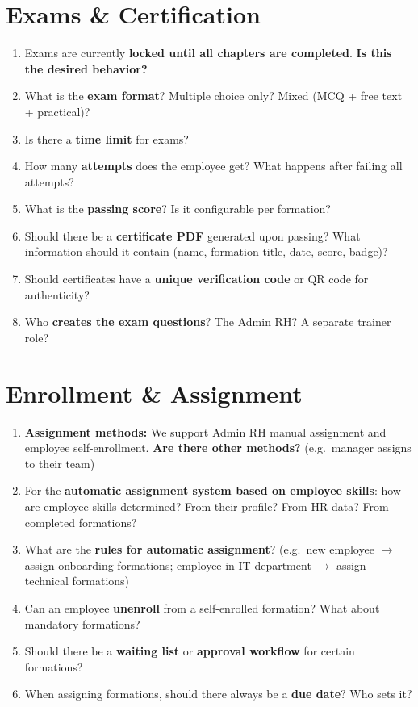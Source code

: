 \documentclass[11pt,a4paper]{article}
\begin{document}
\section{Exams \& Certification}

\begin{enumerate}[leftmargin=2em]
  \item Exams are currently \textbf{locked until all chapters are completed}. \textbf{Is this the desired behavior?}
  \item What is the \textbf{exam format}? Multiple choice only? Mixed (MCQ + free text + practical)?
  \item Is there a \textbf{time limit} for exams?
  \item How many \textbf{attempts} does the employee get? What happens after failing all attempts?
  \item What is the \textbf{passing score}? Is it configurable per formation?
  \item Should there be a \textbf{certificate PDF} generated upon passing? What information should it contain (name, formation title, date, score, badge)?
  \item Should certificates have a \textbf{unique verification code} or QR code for authenticity?
  \item Who \textbf{creates the exam questions}? The Admin RH? A separate trainer role?
\end{enumerate}

\section{Enrollment \& Assignment}

\begin{enumerate}[leftmargin=2em]
  \item \textbf{Assignment methods:} We support Admin RH manual assignment and employee self-enrollment. \textbf{Are there other methods?} (e.g.\ manager assigns to their team)
  \item For the \textbf{automatic assignment system based on employee skills}: how are employee skills determined? From their profile? From HR data? From completed formations?
  \item What are the \textbf{rules for automatic assignment}? (e.g.\ new employee $\rightarrow$ assign onboarding formations; employee in IT department $\rightarrow$ assign technical formations)
  \item Can an employee \textbf{unenroll} from a self-enrolled formation? What about mandatory formations?
  \item Should there be a \textbf{waiting list} or \textbf{approval workflow} for certain formations?
  \item When assigning formations, should there always be a \textbf{due date}? Who sets it?
\end{enumerate}
\end{document}
